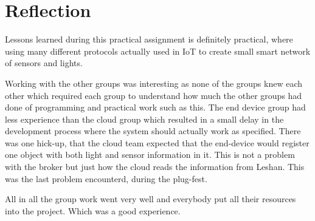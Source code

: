 \section{Reflection}

Lessons learned during this practical assignment is definitely practical, where using many different protocols actually used in IoT to create small smart network of sensors and lights.

Working with the other groups was interesting as none of the groups knew each other which required each group to understand how much the other groups had done of programming and practical work such as this. The end device group had less experience than the cloud group which resulted in a small delay in the development process where the system should actually work as specified. There was one hick-up, that the cloud team expected that the end-device would register one object with both light and sensor information in it. This is not a problem with the broker but just how the cloud reads the information from Leshan. This was the last problem encounterd, during the plug-fest.

All in all the group work went very well and everybody put all their resources into the project. Which was a good experience.   
